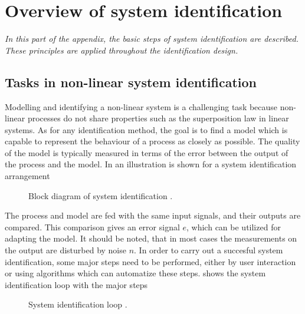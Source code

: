 \chapter{Overview of system identification}
\label{identification_methods}

\emph{In this part of the appendix, the basic steps of system identification are described. These principles are applied throughout the identification design.}

\section{Tasks in non-linear system identification}
\label{tasks_nonlinear_sys_identification}

Modelling and identifying a non-linear system is a challenging task because non-linear processes do not share properties such as the superposition law in linear systems. As for any identification method, the goal is to find a model which is capable to represent the behaviour of a process as closely as possible. The quality of the model is typically measured in terms of the error between the output of the process and the model. In  an illustration is shown for a system identification arrangement 
\vspace{-3mm}
\begin{figure}[H]
\centering
 
\vspace{-3mm}
\caption{Block diagram of system identification \cite{nelles2013nonlinear}.}
\label{fig:nonlin_block}
\end{figure}

\vspace{-4mm}

The process and model are fed with the same input signals, and their outputs are compared. This comparison gives an error signal $e$, which can be utilized for adapting the model. It should be noted, that in most cases the measurements on the output are disturbed by noise $n$. In order to carry out a succesful system identification, some major steps need to be performed, either by user interaction or using algorithms which can automatize these steps.  shows the system identification loop with the major steps

\begin{figure}[H]
\centering
 
\caption{System identification loop \cite{nelles2013nonlinear}.}
\label{fig:identification_loop}
\end{figure}

